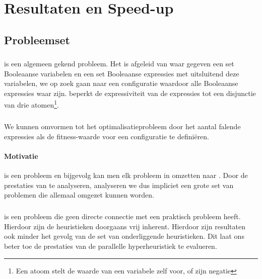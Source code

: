 \chapter{Resultaten en Speed-up}


\section{Probleemset}

\subsection{}

 is een algemeen gekend probleem. Het is afgeleid van  waar gegeven een set Booleaanse variabelen en een set Booleaanse expressies met uitsluitend deze variabelen, we op zoek gaan naar een configuratie waardoor alle Booleaanse expressies waar zijn.  beperkt de expressiviteit van de expressies tot een disjunctie van drie atomen\footnote{Een atoom stelt de waarde van een variabele zelf voor, of zijn negatie}.

\paragraph{}
We kunnen  omvormen tot het optimalisatieprobleem  door het aantal falende expressies als de fitness-waarde voor een configuratie te defini\"eren.

\subsubsection{Motivatie}

 is een  probleem en bijgevolg kan men elk probleem in  omzetten naar . Door de prestaties van  te analyseren, analyseren we dus impliciet een grote set van problemen die allemaal omgezet kunnen worden.

\paragraph{}
 is een probleem die geen directe connectie met een praktisch probleem heeft. Hierdoor zijn de heuristieken doorgaans vrij inherent. Hierdoor zijn resultaten ook minder het gevolg van de set van onderliggende heuristieken. Dit laat ons beter toe de prestaties van de parallelle hyperheuristiek te evalueren.

